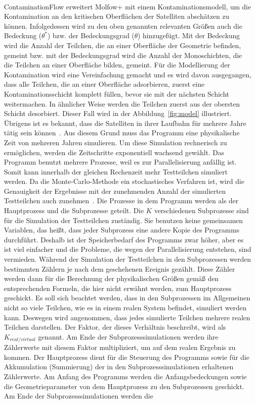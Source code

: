 \documentclass{listhesis}
\begin{document}
\paragraph{}
ContaminationFlow erweitert Molfow+ mit einem Kontaminationsmodell, um die Kontamination an den kritischen Oberflächen der Satelliten abschätzen zu können. Infolgedessen wird zu den oben genannten relevanten Größen auch die Bedeckung ($\theta^*$) bzw. der Bedeckungsgrad ($\theta$) hinzugefügt. Mit der Bedeckung wird die Anzahl der Teilchen, die an einer Oberfläche der Geometrie befinden, gemeint bzw. mit der Bedeckungsgrad wird die Anzahl der Monoschichten, die die Teilchen an einer Oberfläche bilden, gemeint. Für die Modellierung der Kontamination wird eine Vereinfachung gemacht und es wird davon ausgegangen, dass alle Teilchen, die an einer Oberfläche adsorbieren, zuerst eine Kontaminationsschicht komplett füllen, bevor sie mit der nächsten Schicht weitermachen. In ähnlicher Weise werden die Teilchen zuerst aus der obersten Schicht desorbiert. Dieser Fall wird in der Abbildung~\ref{fig:model} illustriert. Übrigens ist es bekannt, dass die Satelliten in ihrer Laufbahn für mehrere Jahre tätig sein können~\cite{Jiao}. Aus diesem Grund muss das Programm eine physikalische Zeit von mehreren Jahren simulieren. Um diese Simulation rechnerisch zu ermöglichen, werden die Zeitschritte exponentiell wachsend gewählt. Das Programm benutzt mehrere Prozesse, weil es zur Parallelisierung anfällig ist. Somit kann innerhalb der gleichen Rechenzeit mehr Testteilchen simuliert werden. Da die Monte-Carlo-Methode ein stochastisches Verfahren ist, wird die Genauigkeit der Ergebnisse mit der zunehmenden Anzahl der simulierten Testteilchen auch zunehmen~\cite{fenrg}. Die Prozesse in dem Programm werden als der Hauptprozess und die Subprozesse geteilt. Die $K$ verschiedenen Subprozesse sind für die Simulation der Testteilchen zuständig. Sie benutzen keine gemeinsamen Variablen, das heißt, dass jeder Subprozess eine andere Kopie des Programms durchführt. Deshalb ist der Speicherbedarf des Programms zwar höher, aber es ist viel einfacher und die Probleme, die wegen der Parallelisierung entstehen, sind vermieden. Während der Simulation der Testteilchen in den Subprozessen werden bestimmten Zählern je nach dem geschehenen Ereignis gezählt. Diese Zähler werden dann für die Berechnung der physikalischen Größen gemäß den entsprechenden Formeln, die hier nicht erwähnt werden, zum Hauptprozess geschickt. Es soll sich beachtet werden, dass in den Subprozessen im Allgemeinen nicht so viele Teilchen, wie es in einem realen System befindet, simuliert werden kann. Deswegen wird angenommen, dass jedes simulierte Teilchen mehrere realen Teilchen darstellen. Der Faktor, der dieses Verhältnis beschreibt, wird als $K_{real/virtual}$ genannt. Am Ende der Subprozesssimulationen werden ihre Zählerwerte mit diesem Faktor multipliziert, um auf dem realen Ergebnis zu kommen. Der Hauptprozess dient für die Steuerung des Programms sowie für die Akkumulation (Summierung) der in den Subprozesssimulationen erhaltenen Zählerwerte. Am Anfang des Programms werden die Anfangsbedeckungen sowie die Geometrieparameter von dem Hauptprozess zu den Subprozessen geschickt. Am Ende der Subprozesssimulationen werden die 
\end{document}
